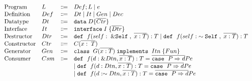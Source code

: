 \documentclass[ oneside,%
                    author={James Elgar},
                    degree={MEng},
                     title={Bidirectional transformer between functional and \\ object-oriented programming in Rust},
                  subtitle={}]{dissertation}
\begin{document}
\begin{figure}[t]
  \begin{displaymath}
    \begin{array}{l}
      \begin{array}{llcl}
        \text{Program}
        & L & \Coloneqq & Def ; L \mid e\\
        \text{Definition}
        & Def & \Coloneqq & Dt \mid It \mid Gen \mid  Dec \\
        \text{Datatype}
         & Dt & \Coloneqq & \texttt{data} \; D \{ {\overline{{Ctr}}} \}\\
        \text{Interface}
         & It & \Coloneqq & \texttt{interface} \; I \; \{ {\overline{{Dtr}}} \}\\
        \text{Destructor}
         & Dtr & \Coloneqq & \texttt{def} \; \ f(self:\; \&\texttt{Self} \;, \;\overline{x: T}): T \mid \texttt{def} \; \ f(self:\; \sim \texttt{Self} \;, \;\overline{x: T}): T\\
        \text{Constructor}
        & Ctr & \Coloneqq & C(\overline{x:\; T}) \; \\
        \text{Generator}
         & Gen & \Coloneqq & \texttt{class} \; \; {G} (\overline{{x} : {T}}) \; \texttt{implements} \; \; {Itn} \; \{ {{Fun}} \}\\
         
        \text{Consumer}
        & Csm & \Coloneqq & \texttt{def} \; \ f(d: \&Dtn, \overline{x: T}): T = \overline{\texttt{case} \;\ {P} \Rightarrow {d}} {P} {e} \\
        &     &           & \mid \texttt{def} \; \ f(d: Dtn, \overline{x: T}): T = \overline{\texttt{case} \;\ {P} \Rightarrow {d}} {P} {e}\\
        &     &           & \mid \texttt{def} \; \ f(d: \sim Dtn, \overline{x: T}): T = \overline{\texttt{case} \;\ {P} \Rightarrow {d}} {P} {e}\\
        

\end{array}
\end{array}
\end{displaymath}
\end{figure}
\end{document}
